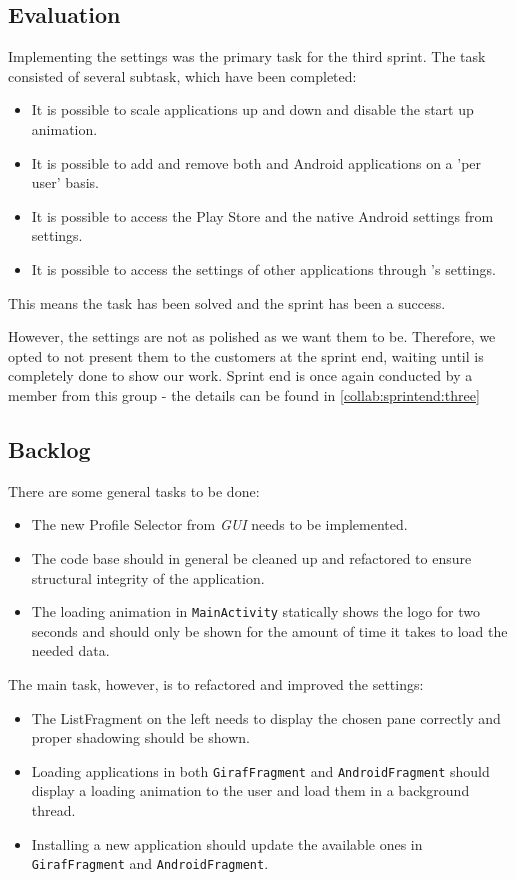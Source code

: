 \subsection{Evaluation}
Implementing the settings was the primary task for the third sprint.
The task consisted of several subtask, which have been completed:

\begin{itemize}
\item It is possible to scale applications up and down and disable the start up animation.
\item It is possible to add and remove both \giraf and Android applications on a 'per user' basis.
\item It is possible to access the Play Store and the native Android settings from settings.
\item It is possible to access the settings of other \giraf applications through \launcher 's settings.
\end{itemize}

This means the task has been solved and the sprint has been a success. 

However, the settings are not as polished as we want them to be.
Therefore, we opted to not present them to the customers at the sprint end, waiting until \launcher is completely done to show our work.
Sprint end is once again conducted by a member from this group - the details can be found in \cref{collab:sprintend:three}

\subsection{Backlog}

There are some general tasks to be done:

\begin{itemize}
\item The new Profile Selector from \textit{GUI} needs to be implemented.
\item The code base should in general be cleaned up and refactored to ensure structural integrity of the application.
\item The loading animation in \lstinline!MainActivity! statically shows the logo for two seconds and should only be shown for the amount of time it takes to load the needed data.
\end{itemize}

The main task, however, is to refactored and improved the settings:

\begin{itemize}
\item The ListFragment on the left needs to display the chosen pane correctly and proper shadowing should be shown.
\item Loading applications in both \lstinline!GirafFragment! and \lstinline!AndroidFragment! should display a loading animation to the user and load them in a background thread.
\item Installing a new application should update the available ones in \lstinline!GirafFragment! and \lstinline!AndroidFragment!.
\end{itemize}